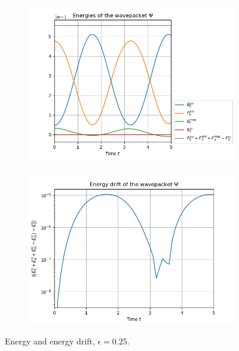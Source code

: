 \documentclass[11pt, a4paper, oneside]{article}
\begin{document}
\begin{figure}[h]
  \begin{subfigure}[b]{0.45 \textwidth}
    \includegraphics[width = \textwidth]{graphics/torsional/energies_block0.PNG}
  \end{subfigure}
  \hfill
  \begin{subfigure}[b]{0.45 \textwidth}
    \includegraphics[width = \textwidth]{graphics/torsional/energy_drift_block0_log.PNG}
  \end{subfigure}
  \caption{Energy and energy drift, $\epsilon = 0.25$.}
  \label{fig:cos_energy}
\end{figure}
\end{document}
